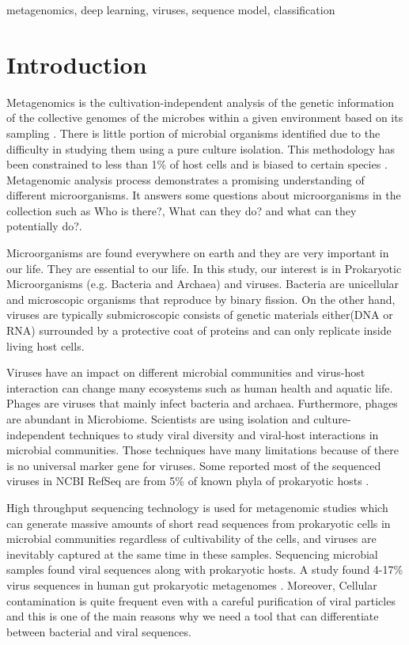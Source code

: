 \documentclass[conference]{IEEEtran}
\begin{document}
\begin{IEEEkeywords}
metagenomics, deep learning, viruses, sequence model, classification 
\end{IEEEkeywords}


\section{Introduction}

Metagenomics is the cultivation-independent analysis of the genetic information of the collective genomes of the microbes within a given environment based on its sampling \cite{izard2014metagenomics}. There is little portion of microbial organisms identified due to the difficulty in studying them using a pure culture isolation. This methodology has been constrained to less than 1\% of host cells and is biased to certain species \cite{labonte2015single}.
Metagenomic analysis process demonstrates a promising understanding of different microorganisms. It answers some questions about microorganisms in the collection such as Who is there?, What can they do? and what can they potentially do?.



Microorganisms are found everywhere on earth and they are very important in our life. They are essential to our life. In this study, our interest is in Prokaryotic Microorganisms
(e.g. Bacteria and Archaea) and viruses. Bacteria are unicellular and microscopic organisms that reproduce by binary fission. On the other hand, viruses are typically submicroscopic consists of genetic materials either(DNA or RNA) surrounded by a protective coat of proteins and can only replicate inside living host cells. 

Viruses have an impact on different microbial communities and virus-host interaction can change many ecosystems such as human health and aquatic life. Phages are viruses that mainly infect bacteria and archaea. Furthermore, phages are abundant in Microbiome. Scientists are using isolation and culture-independent techniques to study viral diversity and viral-host interactions in microbial communities. Those techniques have many limitations because of there is no universal marker gene for viruses. Some reported most of the sequenced viruses in NCBI RefSeq are from 5\% of known phyla of prokaryotic hosts \cite{roux2015viral}.

High throughput sequencing technology is used for metagenomic studies which can generate massive amounts of short read sequences from prokaryotic cells in microbial communities regardless of cultivability of the cells, and viruses are inevitably captured at the same time in these samples. Sequencing microbial samples found viral sequences along with prokaryotic hosts. A study found 4-17\% virus sequences in human gut prokaryotic metagenomes \cite{minot2011human}. Moreover, Cellular contamination is quite frequent even with a careful purification of viral particles and this is one of the main reasons why we need a tool that can differentiate between bacterial and viral sequences.
\end{document}

